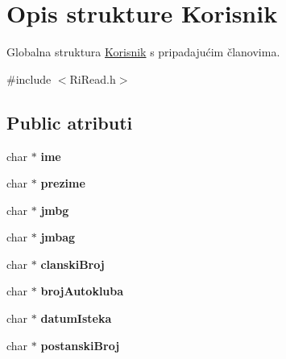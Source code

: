 \hypertarget{struct_korisnik}{}\section{Opis strukture Korisnik}
\label{struct_korisnik}


Globalna struktura \hyperlink{struct_korisnik}{Korisnik} s pripadajućim članovima.  




{\ttfamily \#include $<$Ri\+Read.\+h$>$}

\subsection*{Public atributi}
\begin{DoxyCompactItemize}
\item 
\hypertarget{struct_korisnik_ae66e03d69597cafd1cbf6c0e79db3018}{}char $\ast$ {\bfseries ime}\label{struct_korisnik_ae66e03d69597cafd1cbf6c0e79db3018}

\item 
\hypertarget{struct_korisnik_a04ec32b1501e8523e6494cab60dba144}{}char $\ast$ {\bfseries prezime}\label{struct_korisnik_a04ec32b1501e8523e6494cab60dba144}

\item 
\hypertarget{struct_korisnik_afd161e0b27d23d7ad9ff5dc1e41442ce}{}char $\ast$ {\bfseries jmbg}\label{struct_korisnik_afd161e0b27d23d7ad9ff5dc1e41442ce}

\item 
\hypertarget{struct_korisnik_aeb6450daaf7cb91437922a9eb9f85a9c}{}char $\ast$ {\bfseries jmbag}\label{struct_korisnik_aeb6450daaf7cb91437922a9eb9f85a9c}

\item 
\hypertarget{struct_korisnik_a395ff8ee7ed60563f25b59f799db312d}{}char $\ast$ {\bfseries clanski\+Broj}\label{struct_korisnik_a395ff8ee7ed60563f25b59f799db312d}

\item 
\hypertarget{struct_korisnik_a2a478cee4442c50570a8c0c1b261dc50}{}char $\ast$ {\bfseries broj\+Autokluba}\label{struct_korisnik_a2a478cee4442c50570a8c0c1b261dc50}

\item 
\hypertarget{struct_korisnik_a674009dfff435d61409224b35fe86bb4}{}char $\ast$ {\bfseries datum\+Isteka}\label{struct_korisnik_a674009dfff435d61409224b35fe86bb4}

\item 
\hypertarget{struct_korisnik_ad19207819b591578930e952632fd5211}{}char $\ast$ {\bfseries postanski\+Broj}\label{struct_korisnik_ad19207819b591578930e952632fd5211}


\end{DoxyCompactItemize}
